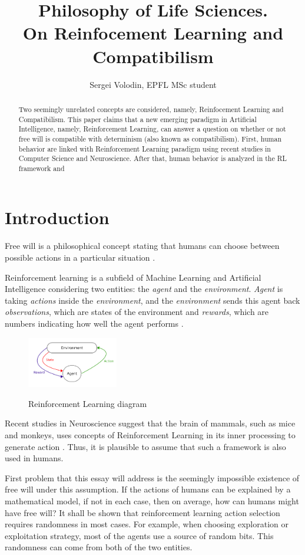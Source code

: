 \documentclass[a4paper]{article}
\title{Philosophy of Life Sciences.\\ On Reinfocement Learning and Compatibilism}
\author{Sergei Volodin, EPFL MSc student}
\date{}
\begin{document}
\maketitle

\begin{abstract}
Two seemingly unrelated concepts are considered, namely, Reinfocement Learning and Compatibilism. This paper claims that a new emerging paradigm in Artificial Intelligence, namely, Reinforcement Learning, can answer a question on whether or not free will is compatible with determinism (also known as compatibilism).
First, human behavior are linked with Reinforcement Learning paradigm using recent studies in Computer Science and Neuroscience.
After that, human behavior is analyzed in the RL framework and 
\end{abstract}

\section{Introduction}
Free will is a philosophical concept stating that humans can choose between possible actions in a particular situation \cite{freewillst}.

Reinforcement learning is a subfield of Machine Learning and Artificial Intelligence considering two entities: the {\em agent} and the {\em environment}. {\em Agent} is taking {\em actions} inside the {\em environment}, and the {\em environment} sends this agent back {\em observations}, which are states of the environment and {\em rewards}, which are numbers indicating how well the agent performs \cite{sutton}.

\begin{figure}[h]
	\caption{Reinforcement Learning diagram}
	\centering \includegraphics[width=150px]{RL.png}
	\label{RL}
\end{figure}

Recent studies in Neuroscience suggest that the brain of mammals, such as mice and monkeys, uses concepts of Reinforcement Learning in its inner processing to generate action \cite{doyareward, doya2}. Thus, it is plausible to assume that such a framework is also used in humans.

First problem that this essay will address is the seemingly impossible existence of free will under this assumption. If the actions of humans can be explained by a mathematical model, if not in each case, then on average, how can humans might have free will? It shall be shown that reinforcement learning action selection requires randomness in most cases. For example, when choosing exploration or exploitation strategy, most of the agents use a source of random bits. This randomness can come from both of the two entities.
\end{document}

